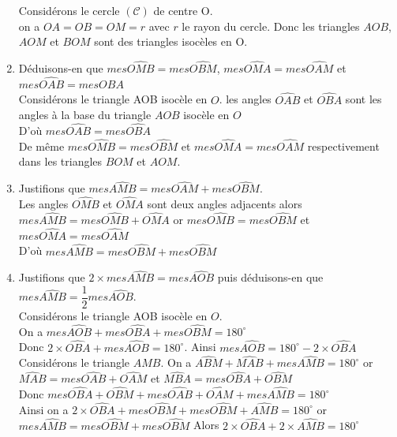 \begin{multicols*}{2}
\begin{enumerate}
  		Considérons le cercle $ \mathcal{(C)} $ de centre O.\\ on a $ OA=OB=OM=r $ avec $ r $ le rayon du cercle.
  		Donc les triangles $ AOB $, $ AOM $ et $ BOM $ sont des triangles isocèles en O.
  		\item Déduisons-en que $ mes\widehat{OMB}=mes\widehat{OBM} $, $ mes\widehat{OMA}=mes\widehat{OAM} $ et $ mes\widehat{OAB}=mes\widehat{OBA} $\\
  		Considérons le triangle AOB isocèle en $ O $. les angles $  \widehat{OAB} $ et $\widehat{OBA} $ sont les angles à la base du triangle $ AOB $ isocèle en $ O $\\
  		D'où $ mes\widehat{OAB}=mes\widehat{OBA} $ \\
  		De même $ mes\widehat{OMB}=mes\widehat{OBM} $ et  $ mes\widehat{OMA}=mes\widehat{OAM} $ respectivement dans les triangles $ BOM $ et $ AOM $.
  		\item Justifions que $mes\widehat{AMB}=mes\widehat{O AM}+mes\widehat{OBM} $.\\
  		Les angles $ \widehat{OMB} $ et $  \widehat{OMA} $ sont deux angles adjacents alors $ mes  \widehat{AMB}= mes\widehat{OMB}+ \widehat{OMA} $ or $ mes\widehat{OMB}=mes\widehat{OBM} $ et $ mes\widehat{OMA}=mes\widehat{OAM} $\\
  		D'où $mes\widehat{AMB}=mes\widehat{OBM}+mes\widehat{OBM} $
  		\item  Justifions que $ 2 \times mes\widehat{AMB}=mes \widehat{AOB} $ puis déduisons-en que $ mes\widehat{AMB}=\dfrac{1}{2}mes\widehat{AOB}  $.\\
  		Considérons le triangle AOB isocèle en $ O $.
  		\\ On a $mes\widehat{AOB}+mes\widehat{OBA}+mes\widehat{OBM}=180^\circ $\\Donc $ 2\times \widehat{OBA}+mes \widehat{AOB}=180^\circ $. Ainsi $ mes \widehat{AOB}=180^\circ-2\times \widehat{OBA} $ 
  		\\ Considérons le triangle $ AMB $. On a $  \widehat{ABM}+ \widehat{MAB}+mes  \widehat{AMB} =180^\circ$ or $  \widehat{MAB}=mes  \widehat{OAB}+ \widehat{OAM} $ et $ \widehat{MBA}=mes  \widehat{OBA}+ \widehat{OBM} $\\ Donc $  mes  \widehat{OBA}+ \widehat{OBM} + mes  \widehat{OAB}+ \widehat{OAM} +mes  \widehat{AMB} =180^\circ$ \\ Ainsi on a  $ 2\times \widehat{OBA} +  mes\widehat{OBM}+mes\widehat{OBM} +\widehat{AMB}=180^\circ$ or $mes\widehat{AMB}=mes\widehat{OBM}+mes\widehat{OBM}$ Alors $ 2\times \widehat{OBA}+2\times \widehat{AMB}=180^\circ $ \\

\end{enumerate}
\end{multicols*}
